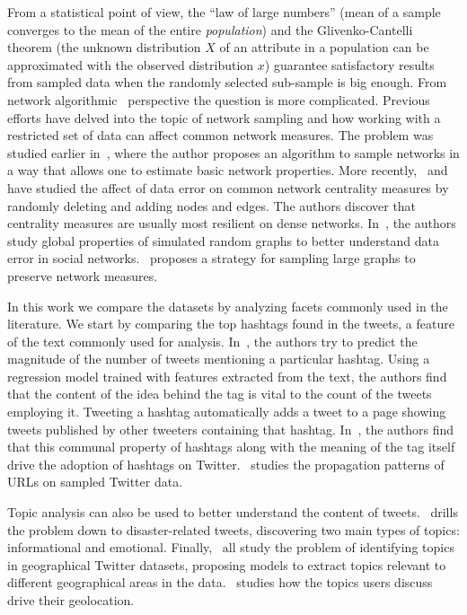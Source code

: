 \documentclass[letterpaper]{article}
\begin{document}
From a statistical point of view, the ``law of large numbers'' (mean of a sample converges to the mean of the entire \emph{population})
and the Glivenko-Cantelli theorem (the unknown distribution $X$ of an attribute in a population can be approximated with the observed distribution $x$) guarantee satisfactory results from sampled data when the randomly selected sub-sample is big enough. From network algorithmic~\cite{Wasserman1994} perspective the question is more complicated. Previous efforts have delved into the topic of network sampling and how working with a restricted set of data can affect common network measures. The problem was studied earlier in~\cite{gran76}, where the author proposes an algorithm to sample networks in a way that allows one to estimate basic network properties. More recently,~\cite{Cost03} and~\cite{Borg06} have studied the affect of data error on common network centrality measures by randomly deleting and adding nodes and edges. The authors discover that centrality measures are usually most resilient on dense networks. In~\cite{Koss06}, the authors study global properties of simulated random graphs to better understand data error in social networks.~\cite{leskovec2006sampling} proposes a strategy for sampling large graphs to preserve network measures. 

In this work we compare the datasets by analyzing facets commonly used in the literature. We start by comparing the top hashtags found in the tweets, a feature of the text commonly used for analysis. In~\cite{tsur2012s}, the authors try to predict the magnitude of the number of tweets mentioning a particular hashtag. Using a regression model trained with features extracted from the text, the authors find that the content of the idea behind the tag is vital to the count of the tweets employing it. Tweeting a hashtag automatically adds a tweet to a page showing tweets published by other tweeters containing that hashtag. In~\cite{Yang-etal12}, the authors find that this communal property of hashtags along with the meaning of the tag itself drive the adoption of hashtags on Twitter.~\cite{de2010does} studies the propagation patterns of URLs on sampled Twitter data.

Topic analysis can also be used to better understand the content of tweets.~\cite{kire09} drills the problem down to disaster-related tweets, discovering two main types of topics: informational and emotional. Finally,~\cite{Yin11,Hong12,Pozd-11} all study the problem of identifying topics in geographical Twitter datasets, proposing models to extract topics relevant to different geographical areas in the data.~\cite{Jose12} studies how the topics users discuss drive their geolocation.
\end{document}
